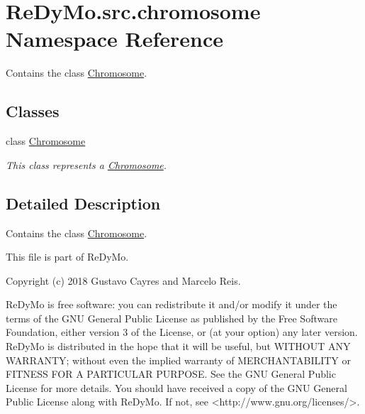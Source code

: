 \hypertarget{namespaceReDyMo_1_1src_1_1chromosome}{}\section{Re\+Dy\+Mo.\+src.\+chromosome Namespace Reference}
\label{namespaceReDyMo_1_1src_1_1chromosome}


Contains the class \mbox{\hyperlink{classReDyMo_1_1src_1_1chromosome_1_1Chromosome}{Chromosome}}.  


\subsection*{Classes}
\begin{DoxyCompactItemize}
\item 
class \mbox{\hyperlink{classReDyMo_1_1src_1_1chromosome_1_1Chromosome}{Chromosome}}
\begin{DoxyCompactList}\small\item\em This class represents a \mbox{\hyperlink{classReDyMo_1_1src_1_1chromosome_1_1Chromosome}{Chromosome}}. \end{DoxyCompactList}\end{DoxyCompactItemize}


\subsection{Detailed Description}
Contains the class \mbox{\hyperlink{classReDyMo_1_1src_1_1chromosome_1_1Chromosome}{Chromosome}}. 

\begin{DoxyVerb}This file is part of ReDyMo.

    Copyright (c) 2018  Gustavo Cayres and Marcelo Reis.

    ReDyMo is free software: you can redistribute it and/or modify it
    under the terms of the GNU General Public License as published by the
    Free Software Foundation, either version 3 of the License, or (at your
    option) any later version.
    ReDyMo is distributed in the hope that it will be useful, but WITHOUT
    ANY WARRANTY; without even the implied warranty of MERCHANTABILITY or
    FITNESS FOR A PARTICULAR PURPOSE. See the GNU General Public License
    for more details.
    You should have received a copy of the GNU General Public License along
    with ReDyMo. If not, see <http://www.gnu.org/licenses/>.
\end{DoxyVerb}
